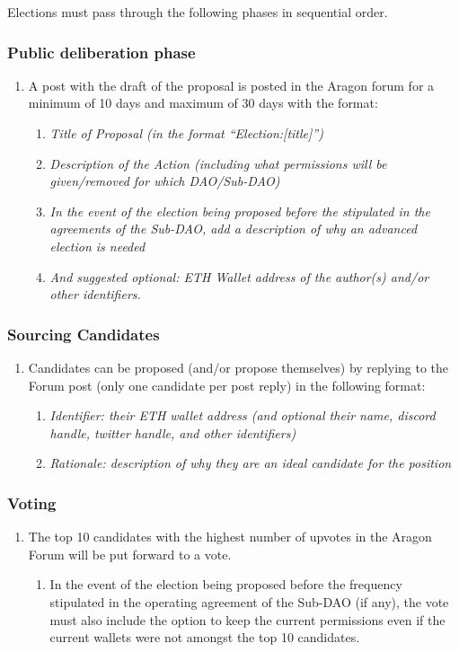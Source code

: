 Elections must pass through the following phases in sequential order.

\subsubsection*{Public deliberation phase} 

\begin{enumerate}
	\item A post with the draft of the proposal is posted in the Aragon forum for a minimum of 10 days and maximum of 30 days with the format:
	\begin{enumerate}
		\item \textit{Title of Proposal (in the format “Election:[title]”)}
		\item \textit{Description of the Action (including what permissions will be given/removed for which \ac{DAO}/Sub-\ac{DAO})}
		\item \textit{In the event of the election being proposed before the stipulated in the agreements of the Sub-\ac{DAO}, add a description of why an advanced election is needed}
		\item \textit{And suggested optional: ETH Wallet address of the author(s) and/or other identifiers.}
	\end{enumerate}
\end{enumerate}

\subsubsection*{Sourcing Candidates}

\begin{enumerate}
	\item Candidates can be proposed (and/or propose themselves) by replying to the Forum post (only one candidate per post reply) in the following format:
	\begin{enumerate}
		\item \textit{Identifier: their ETH wallet address (and optional their name, discord handle, twitter handle, and other identifiers)}
		\item \textit{Rationale: description of why they are an ideal candidate for the position}
	\end{enumerate}
\end{enumerate}


\subsubsection*{Voting}
\begin{enumerate}
	\item The top 10 candidates with the highest number of upvotes in the Aragon Forum will be put forward to a vote.
	\begin{enumerate}
		\item In the event of the election being proposed before the frequency stipulated in the operating agreement of the Sub-\ac{DAO} (if any), the vote must also include the option to keep the current permissions even if the current wallets were not amongst the top 10 candidates.
	\end{enumerate}
\end{enumerate}

